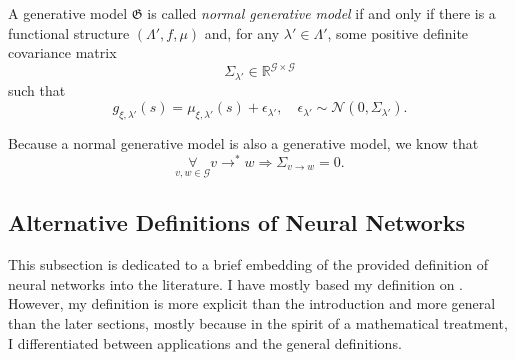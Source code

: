 \documentclass[a4paper,11pt]{report}
\begin{document}
\begin{Def}
A generative model $\mathfrak{G}$ is called \emph{normal generative model} if and only if there is a functional structure $(\Lambda',f,\mu)$ and, for any $\lambda'\in\Lambda'$, some positive definite covariance matrix
\[
\Sigma_{\lambda'}\in\mathbb{R}^{\mathcal{G}\times\mathcal{G}}
\]
such that
\[
g_{\xi,\lambda'}(s)=\mu_{\xi,\lambda'}(s)+\epsilon_{\lambda'},
\quad
\epsilon_{\lambda'}\sim\mathcal{N}(0,\Sigma_{\lambda'}).
\]
\end{Def}

\begin{Rem}
Because a normal generative model is also a generative model, we know that
\[
\underset{v,w\in\mathcal{G}}{\forall}v\to^* w\Rightarrow\Sigma_{v\to w}=0.
\]
\end{Rem}

\subsection{Alternative Definitions of Neural Networks}\label{subsec:theory-structure-other}

\begin{Par}
This subsection is dedicated to a brief embedding of the provided definition of neural networks into the literature. I have mostly based my definition on \cite{Rojas1996}. However, my definition is more explicit than the introduction and more general than the later sections, mostly because in the spirit of a mathematical treatment, I differentiated between applications and the general definitions.
\end{Par}
\end{document}
